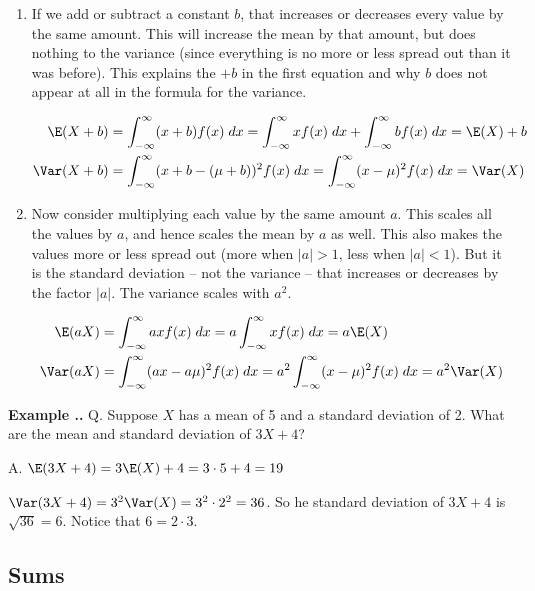 \documentclass[twoside]{book}\usepackage[]{graphicx}\usepackage[]{xcolor}
\def\question{{\sf Q. }}
\def\answer{{\sf A. }}
\newcounter{example}[section]
\newenvironment{example}%
{\refstepcounter{example}%
\textbf{Example \thesection.\arabic{example}. }}%
{}
\begin{document}
\begin{enumerate}
	\item
		If we add or subtract a constant $b$, that increases or decreases every
		value by the same amount.  This will increase the mean by that amount,
		but does nothing to the variance (since everything is no more or less
		spread out than it was before).  This explains the $+b$ in the first
		equation and why $b$ does not appear at all in the formula for the
		variance.

		\begin{align*}
		\E(X + b) &= \int_{-\infty}^{\infty} (x+b) f(x) \; dx  
		      = \int_{-\infty}^{\infty} x f(x) \; dx  
		      	+ \int_{-\infty}^{\infty} b f(x) \; dx  
			  = \E(X) + b
			  \\
		\Var(X+b) &= \int_{-\infty}^{\infty} (x + b - (\mu + b) )^2 f(x) \; dx  
					= \int_{-\infty}^{\infty} (x - \mu)^2 f(x) \; dx  = \Var(X) 
		\end{align*}
	\item
		Now consider multiplying each value by the same amount $a$.  
		This scales all the values by $a$, and hence scales the mean by $a$ as well.
		This also makes the values more or less spread out (more when $|a| > 1$, less when
		$|a| < 1$).  
		But it is the standard deviation -- not the 
		variance -- that increases or decreases by the factor $|a|$.
		The variance scales with $a^2$.

		\begin{align*}
		\E(aX) &= \int_{-\infty}^{\infty} ax f(x) \; dx  
		      = a \int_{-\infty}^{\infty} x f(x) \; dx = a \E(X)
			  \\
		\Var(aX) &= \int_{-\infty}^{\infty} (ax - a\mu)^2 f(x) \; dx  
		      = a^2 \int_{-\infty}^{\infty} (x-\mu)^2 f(x) \; dx = a^2 \Var(X)
		\end{align*}
\end{enumerate}

\begin{example}
	\question
	Suppose $X$ has a mean of 5 and a standard deviation of 2.  What are the mean
	and standard deviation of $3 X + 4$?

	\answer
	$\E(3 X + 4) = 3 \E(X) + 4 = 3 \cdot 5 + 4 = 19$

	$\Var(3 X + 4) = 3^2 \Var(X) = 3^2 \cdot 2^2 = 36$.  So he standard deviation of 
	$3X + 4$ is $\sqrt{36} = 6$.  Notice that $6 = 2 \cdot 3$.
\end{example}

\subsection{Sums}
\end{document}
